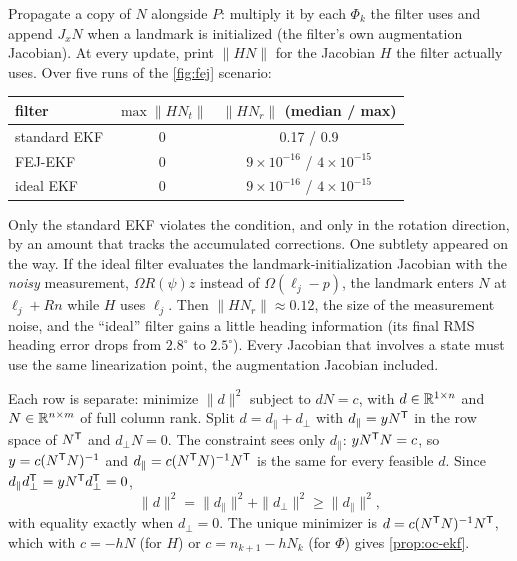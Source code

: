 \begin{solutions}
  \item Propagate a copy of $N$ alongside $P$: multiply it by each $\Phi_k$ the filter uses and append $J_xN$ when a landmark is initialized (the filter's own
        augmentation Jacobian). At every update, print $\|HN\|$ for the Jacobian $H$ the filter actually uses. Over five runs of the \cref{fig:fej} scenario:
        \begin{center}\small
        \begin{tabular}{@{}l c c@{}}
        \toprule
        filter & $\max\|HN_t\|$ & $\|HN_r\|$ (median / max) \\
        \midrule
        standard EKF & 0 & 0.17 / 0.9 \\
        FEJ-EKF & 0 & $9\times10^{-16}$ / $4\times10^{-15}$ \\
        ideal EKF & 0 & $9\times10^{-16}$ / $4\times10^{-15}$ \\
        \bottomrule
        \end{tabular}
        \end{center}
        Only the standard EKF violates the condition, and only in the rotation direction, by an amount that tracks the accumulated corrections. One subtlety
        appeared on the way. If the ideal filter evaluates the landmark-initialization Jacobian with the \emph{noisy} measurement, $\Omega R(\psi)z$ instead of $\Omega(\ell_j - p)$, the landmark
        enters $N$ at $\ell_j + Rn$ while $H$ uses $\ell_j$. Then $\|HN_r\| \approx 0.12$, the size of the measurement noise, and the ``ideal'' filter gains a little heading information (its
        final RMS heading error drops from $2.8^\circ$ to $2.5^\circ$). Every Jacobian that involves a state must use the same linearization point, the augmentation Jacobian
        included.

  \item Each row is separate: minimize $\|d\|^2$ subject to $dN = c$, with $d \in \mathbb{R}^{1\times n}$ and $N \in \mathbb{R}^{n\times m}$ of full column rank. Split $d = d_\parallel + d_\perp$ with $d_\parallel = yN^{\mathsf{T}}$ in the row space of
        $N^{\mathsf{T}}$ and $d_\perp N = 0$. The constraint sees only $d_\parallel$: $yN^{\mathsf{T}} N = c$, so $y = c(N^{\mathsf{T}} N)^{-1}$ and $d_\parallel = c(N^{\mathsf{T}} N)^{-1} N^{\mathsf{T}}$ is the same for every feasible $d$. Since $d_\parallel d_\perp^{\mathsf{T}} = yN^{\mathsf{T}} d_\perp^{\mathsf{T}} = 0$,
        \[
          \|d\|^2 = \|d_\parallel\|^2 + \|d_\perp\|^2 \ge \|d_\parallel\|^2,
        \]
        with equality exactly when $d_\perp = 0$. The unique minimizer is $d = c(N^{\mathsf{T}} N)^{-1} N^{\mathsf{T}}$, which with $c = -hN$ (for $H$) or $c = n_{k+1} - hN_k$ (for $\Phi$) gives \cref{prop:oc-ekf}.


\end{solutions}

